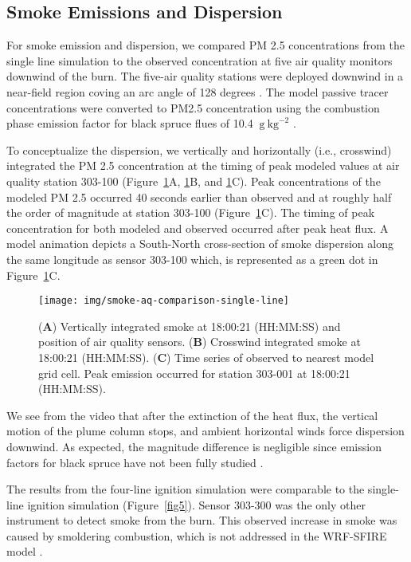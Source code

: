 \documentclass[preprints,article,accept,moreauthors,pdftex]{Definitions/mdpi}
\begin{document}
\subsection{Smoke Emissions and Dispersion}

For smoke emission and dispersion, we compared PM 2.5 concentrations from the single line simulation to the observed concentration at five air quality monitors downwind of the burn. The five-air quality stations were deployed downwind in a near-field region coving an arc angle of 128 degrees \cite{huda_study_2020}. The model passive tracer concentrations were converted to PM2.5 concentration using the combustion phase emission factor for black spruce flues of 10.4 $\mathrm{~g}\mathrm{~kg}^{-2}$ \cite{prichard_wildland_2020}.


To conceptualize the dispersion, we vertically and horizontally (i.e., crosswind) integrated the PM 2.5 concentration at the timing of peak modeled values at air quality station 303-100 (Figure~\ref{fig4}A, \ref{fig4}B, and \ref{fig4}C). Peak concentrations of the modeled PM 2.5 occurred 40 seconds earlier than observed and at roughly half the order of magnitude at station 303-100 (Figure~\ref{fig4}C). The timing of peak concentration for both modeled and observed occurred after peak heat flux. A model animation depicts a South-North cross-section of smoke dispersion along the same longitude as sensor 303-100 which, is represented as a green dot in Figure~\ref{fig4}C.

\begin{figure}[H]
\centering
 \texttt{[image: img/smoke-aq-comparison-single-line]}
 \caption{(\textbf{A}) Vertically integrated smoke at 18:00:21 (HH:MM:SS) and position of air quality sensors. (\textbf{B}) Crosswind integrated smoke at 18:00:21 (HH:MM:SS). (\textbf{C}) Time series of observed to nearest model grid cell. Peak emission occurred for station 303-001 at 18:00:21 (HH:MM:SS).\label{fig4}}
 \end{figure}

We see from the video that after the extinction of the heat flux, the vertical motion of the plume column stops, and ambient horizontal winds force dispersion downwind. As expected, the magnitude difference is negligible since emission factors for black spruce have not been fully studied \cite{prichard_wildland_2020}.

The results from the four-line ignition simulation were comparable to the single-line ignition simulation (Figure~\ref{fig5}). Sensor 303-300 was the only other instrument to detect smoke from the burn. This observed increase in smoke was caused by smoldering combustion, which is not addressed in the WRF-SFIRE model \cite{mallia_incorporating_2020,mandel_coupled_2011,mandel_recent_2014}.
\end{document}
